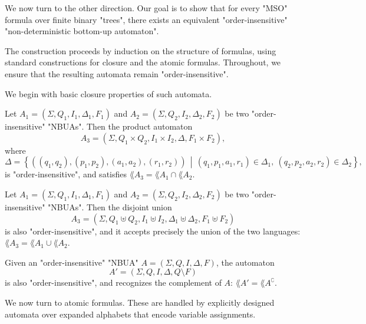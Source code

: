 \documentclass[a4paper,UKenglish,cleveref, autoref, thm-restate]{lipics-v2021}
\begin{document}
We now turn to the other direction. Our goal is to show that for every "MSO" formula over finite binary "trees",
there exists an equivalent "order-insensitive" "non-deterministic bottom-up automaton".

The construction proceeds by induction on the structure of formulas, using standard constructions for closure and the atomic formulas.
Throughout, we ensure that the resulting automata remain "order-insensitive".

We begin with basic closure properties of such automata.

\begin{lemma}[Intersection]\label{lem:intersection}
	Let $A_1 = (\Sigma, Q_1, I_1, \Delta_1, F_1)$ and $A_2 = (\Sigma, Q_2, I_2, \Delta_2, F_2)$ be two "order-insensitive" "NBUAs". Then the product automaton
	\[
		A_3 = (\Sigma, Q_1 \times Q_2, I_1 \times I_2, \Delta, F_1 \times F_2),
	\]
	where
	\[
		\Delta = \left\{ ((q_1,q_2), (p_1,p_2), (a_1,a_2), (r_1,r_2)) \,\middle|\, (q_1,p_1,a_1,r_1) \in \Delta_1,\ (q_2,p_2,a_2,r_2) \in \Delta_2 \right\},
	\]
	is "order-insensitive", and satisfies $\lang{A_3} = \lang{A_1} \cap \lang{A_2}$.
\end{lemma}

\begin{lemma}[Union]\label{lem:union}
	Let $A_1 = (\Sigma, Q_1, I_1, \Delta_1, F_1)$ and $A_2 = (\Sigma, Q_2, I_2, \Delta_2, F_2)$ be two "order-insensitive" "NBUAs". Then the disjoint union
	\[
		A_3 = (\Sigma, Q_1 \uplus Q_2, I_1 \uplus I_2, \Delta_1 \uplus \Delta_2, F_1 \uplus F_2)
	\]
	is also "order-insensitive", and it accepts precisely the union of the two languages: $\lang{A_3} = \lang{A_1} \cup \lang{A_2}$.
\end{lemma}

\begin{lemma}[Complement]\label{lem:complement}
	Given an "order-insensitive" "NBUA" $A = (\Sigma, Q, I, \Delta, F)$, the automaton
	\[
		A' = (\Sigma, Q, I, \Delta, Q \setminus F)
	\]
	is also "order-insensitive", and recognizes the complement of $A$: $\lang{A'} = \lang{A}^\complement$.
\end{lemma}

We now turn to atomic formulas. These are handled by explicitly designed automata over expanded alphabets that encode variable assignments.

\end{document}
